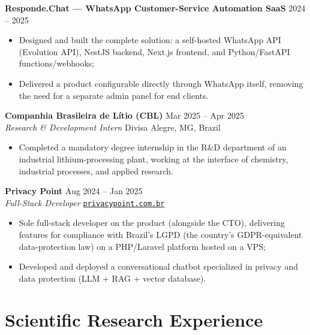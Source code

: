 \documentclass[10pt,a4paper]{article}
\newcommand{\entry}[4]{%
  \textbf{\sffamily\large #1} \hfill #2 \\
  {\itshape #3} \hfill {\small #4} \\[-0.75em]
}
\newcommand{\subentry}[2]{%
  \hspace{0.4em}\textbf{\sffamily #1} \hfill {\small #2}\\[-0.55em]
}
\newcommand*{\link}[2]{\href{#1}{{\texttt{#2}}}}
\begin{document}
\subentry{Responde.Chat --- WhatsApp Customer-Service Automation SaaS}{2024 -- 2025}
\begin{itemize}[leftmargin=2.2em]\footnotesize
  \item Designed and built the complete solution: a self-hosted WhatsApp API (Evolution API), NestJS backend, Next.js frontend, and Python/FastAPI functions/webhooks;
  \item Delivered a product configurable directly through WhatsApp itself, removing the need for a separate admin panel for end clients.
\end{itemize}

\vspace{0.7em}

\entry{Companhia Brasileira de Lítio (CBL)}{Mar 2025 -- Apr 2025}{Research \& Development Intern}{Divisa Alegre, MG, Brazil}
\begin{itemize}\footnotesize
  \item Completed a mandatory degree internship in the R\&D department of an industrial lithium-processing plant, working at the interface of chemistry, industrial processes, and applied research.
\end{itemize}

\vspace{0.7em}

\entry{Privacy Point}{Aug 2024 -- Jan 2025}{Full-Stack Developer}{\link{https://privacypoint.com.br}{privacypoint.com.br}}
\begin{itemize}\footnotesize
  \item Sole full-stack developer on the product (alongside the CTO), delivering features for compliance with Brazil's LGPD (the country's GDPR-equivalent data-protection law) on a PHP/Laravel platform hosted on a VPS;
  \item Developed and deployed a conversational chatbot specialized in privacy and data protection (LLM + RAG + vector database).
\end{itemize}

\section*{Scientific Research Experience}
\end{document}
